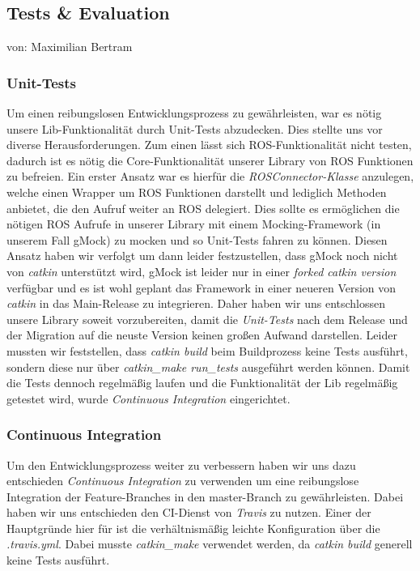 \documentclass{suturo}
\makeatletter
\newcommand{\chapterauthor}[1]{%
  {\parindent0pt\vspace*{-27pt}%
  \linespread{0}\small\begin{flushright}von: #1\end{flushright}%
  \par\nobreak\vspace*{0pt}}
  \@afterheading%
}
\makeatother
\begin{document}
\begin{figure}[!htb]
\end{figure}

\newpage

\subsection{Tests \& Evaluation}
\chapterauthor{Maximilian Bertram}

\subsubsection{Unit-Tests}
Um einen reibungslosen Entwicklungsprozess zu gewährleisten, war es nötig unsere Lib-Funktionalität durch Unit-Tests abzudecken. Dies stellte uns vor diverse Herausforderungen. Zum einen lässt sich ROS-Funktionalität nicht testen, dadurch ist es nötig die Core-Funktionalität unserer Library von ROS Funktionen zu befreien. Ein erster Ansatz war es hierfür die \textit{ROSConnector-Klasse} anzulegen, welche einen Wrapper um ROS Funktionen darstellt und lediglich Methoden anbietet, die den Aufruf weiter an ROS delegiert. Dies sollte es ermöglichen die nötigen ROS Aufrufe in unserer Library mit einem Mocking-Framework (in unserem Fall gMock) zu mocken und so Unit-Tests fahren zu können. Diesen Ansatz haben wir verfolgt um dann leider festzustellen, dass gMock noch nicht von \textit{catkin} unterstützt wird, gMock ist leider nur in einer \textit{forked catkin version} verfügbar und es ist wohl geplant das Framework in einer neueren Version von \textit{catkin} in das Main-Release zu integrieren. Daher haben wir uns entschlossen unsere Library soweit vorzubereiten, damit die \textit{Unit-Tests} nach dem Release und der Migration auf die neuste Version keinen großen Aufwand darstellen. Leider mussten wir feststellen, dass \textit{catkin build} beim Buildprozess keine Tests ausführt, sondern diese nur über \textit{catkin_make run_tests} ausgeführt werden können. Damit die Tests dennoch regelmäßig laufen und die Funktionalität der Lib regelmäßig getestet wird, wurde \textit{Continuous Integration} eingerichtet.

\subsubsection{Continuous Integration}
Um den Entwicklungsprozess weiter zu verbessern haben wir uns dazu entschieden \textit{Continuous Integration} zu verwenden um eine reibungslose Integration der Feature-Branches in den master-Branch zu gewährleisten. Dabei haben wir uns entschieden den CI-Dienst von \textit{Travis} zu nutzen. Einer der Hauptgründe hier für ist die verhältnismäßig leichte Konfiguration über die \textit{.travis.yml}. Dabei musste \textit{catkin_make} verwendet werden, da \textit{catkin build} generell keine Tests ausführt.
\end{document}

